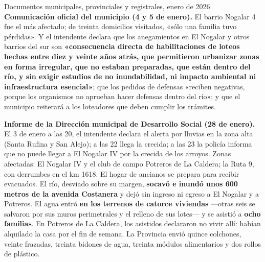 \begin{ficha}{Documentos municipales, provinciales y registrales, enero de 2026}
\textbf{Comunicación oficial del municipio (4 y 5 de enero).} El barrio Nogalar 4 fue el más afectado; de treinta domicilios visitados, «sólo una familia tuvo pérdidas». Y el intendente declara que los anegamientos en El Nogalar y otros barrios del sur son \textbf{«consecuencia directa de habilitaciones de loteos hechas entre diez y veinte años atrás, que permitieron urbanizar zonas en forma irregular, que no estaban preparadas, que están dentro del río, y sin exigir estudios de no inundabilidad, ni impacto ambiental ni infraestructura esencial»}; que los pedidos de defensas «reciben negativas, porque los organismos no aprueban hacer defensas dentro del río»; y que el municipio reiterará a los loteadores que deben cumplir los trámites.

\textbf{Informe de la Dirección municipal de Desarrollo Social (28 de enero).} El 3 de enero a las 20, el intendente declara el alerta por lluvias en la zona alta (Santa Rufina y San Alejo); a las 22 llega la crecida; a las 23 la policía informa que no puede llegar a El Nogalar IV por la crecida de los arroyos. Zonas afectadas: El Nogalar IV y el club de campo Potreros de La Caldera; la Ruta 9, con derrumbes en el km 1618. El hogar de ancianos se prepara para recibir evacuados. El río, desviado sobre su margen, \textbf{socavó e inundó unos 600 metros de la avenida Costanera} y dejó sin ingreso ni egreso a El Nogalar y a Potreros. El agua entró \textbf{en los terrenos de catorce viviendas} ---otras seis se salvaron por sus muros perimetrales y el relleno de sus lotes--- y se asistió a \textbf{ocho familias}. En Potreros de La Caldera, los asistidos declararon no vivir allí: habían alquilado la casa por el fin de semana. La Provincia envió quince colchones, veinte frazadas, treinta bidones de agua, treinta módulos alimentarios y dos rollos de plástico.


\end{ficha}
